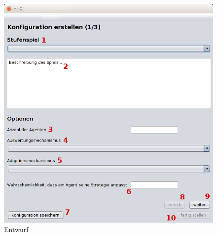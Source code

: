 \begin{figure}[htbp] 
  \centering
     \includegraphics[width=1.0\textwidth]{GUI_Entwurf/WizardFenster1.png}
  \caption{Entwurf}
  \label{fig:Bild1}
\end{figure}

